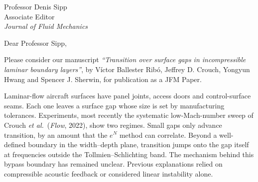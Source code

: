 \documentclass[11pt,a4paper]{letter}
\date{\today}
\newcommand{\AEname}{Professor Denis Sipp}
\newcommand{\AEdear}{Professor Sipp}
\begin{document}
\begin{letter}{\AEname\\Associate Editor\\\textit{Journal of Fluid Mechanics}}

\opening{Dear \AEdear,}

Please consider our manuscript \emph{``Transition over surface gaps in incompressible laminar boundary layers''}, by Víctor Ballester Ribó, Jeffrey D. Crouch, Yongyun Hwang and Spencer J. Sherwin, for publication as a JFM Paper.

Laminar-flow aircraft surfaces have panel joints, access doors and control-surface seams. Each one leaves a surface gap whose size is set by manufacturing tolerances. Experiments, most recently the systematic low-Mach-number sweep of Crouch \textit{et al.}\ (\textit{Flow}, 2022), show two regimes. Small gaps only advance transition, by an amount that the $e^N$ method can correlate. Beyond a well-defined boundary in the width--depth plane, transition jumps onto the gap itself at frequencies outside the Tollmien--Schlichting band. The mechanism behind this bypass boundary has remained unclear. Previous explanations relied on compressible acoustic feedback or considered linear instability alone.


\end{letter}
\end{document}
